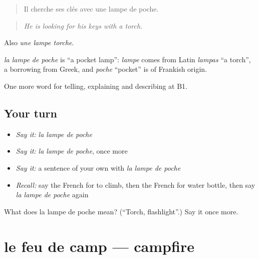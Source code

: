 \begin{quote}
Il cherche ses clés avec une lampe de poche.
\end{quote}

\begin{quote}
\emph{He is looking for his keys with a torch.}
\end{quote}

Also \emph{une lampe torche}.

\begin{cousinweb}
\emph{la lampe de poche} is \textquotedblleft{}a pocket lamp\textquotedblright{}: \emph{lampe} comes from Latin \emph{lampas} \textquotedblleft{}a torch\textquotedblright{}, a borrowing from Greek, and \emph{poche} \textquotedblleft{}pocket\textquotedblright{} is of Frankish origin.
\end{cousinweb}

\begin{grammarlens}[title={What you've built}]
One more word for telling, explaining and describing at B1.
\end{grammarlens}

\subsection*{Your turn}
\begin{itemize}
\raggedright
  \item \emph{Say it:} \emph{la lampe de poche}
  \item \emph{Say it:} \emph{la lampe de poche}, once more
  \item \emph{Say it:} a sentence of your own with \emph{la lampe de poche}
  \item \emph{Recall:} say the French for to climb, then the French for water bottle, then say \emph{la lampe de poche} again
\end{itemize}

\begin{tcolorbox}[breakable,colback=teal!4,colframe=teal!35!black,title={Before you move on}]
What does la lampe de poche mean? (\textquotedblleft{}Torch, flashlight\textquotedblright{}.) Say it once more.
\end{tcolorbox}
\section[le feu de camp]{le feu de camp — campfire}

\label{lesson:FR-C498-feu-de-camp}



